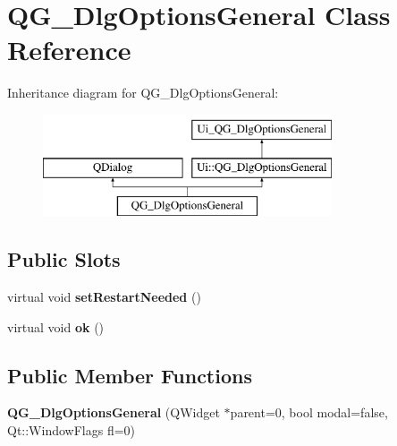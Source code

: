\hypertarget{classQG__DlgOptionsGeneral}{\section{Q\-G\-\_\-\-Dlg\-Options\-General Class Reference}
\label{classQG__DlgOptionsGeneral}
}
Inheritance diagram for Q\-G\-\_\-\-Dlg\-Options\-General\-:\begin{figure}[H]
\begin{center}
\leavevmode
\includegraphics[height=3.000000cm]{classQG__DlgOptionsGeneral}
\end{center}
\end{figure}
\subsection*{Public Slots}
\begin{DoxyCompactItemize}
\item 
\hypertarget{classQG__DlgOptionsGeneral_a08702cab5ce7a396ecea9ea06f4fb5e7}{virtual void {\bfseries set\-Restart\-Needed} ()}\label{classQG__DlgOptionsGeneral_a08702cab5ce7a396ecea9ea06f4fb5e7}

\item 
\hypertarget{classQG__DlgOptionsGeneral_ab909c0aa1bf9d8186ad0575c42c8a613}{virtual void {\bfseries ok} ()}\label{classQG__DlgOptionsGeneral_ab909c0aa1bf9d8186ad0575c42c8a613}

\end{DoxyCompactItemize}
\subsection*{Public Member Functions}
\begin{DoxyCompactItemize}
\item 
\hypertarget{classQG__DlgOptionsGeneral_a014562e825eca16de50ef6bd239c92f3}{{\bfseries Q\-G\-\_\-\-Dlg\-Options\-General} (Q\-Widget $\ast$parent=0, bool modal=false, Qt\-::\-Window\-Flags fl=0)}\label{classQG__DlgOptionsGeneral_a014562e825eca16de50ef6bd239c92f3}

\end{DoxyCompactItemize}

